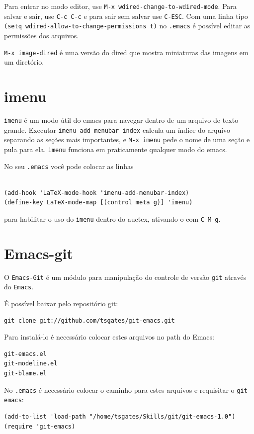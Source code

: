 \documentclass[12pt,brazil]{book}
\begin{document}
Para entrar no modo editor, use \texttt{M-x
  wdired-change-to-wdired-mode}. Para salvar e sair, use \texttt{C-c
  C-c} e para sair sem salvar use \texttt{C-ESC}. Com uma linha tipo
\texttt{(setq wdired-allow-to-change-permissions t)} no
\texttt{.emacs} é possível editar as permissões dos arquivos.

\texttt{M-x image-dired} é uma versão do dired que mostra miniaturas
das imagens em um diretório.


\section{imenu}
\label{sec:imenu}

\texttt{imenu} é um modo útil do emacs para navegar dentro de um
arquivo de texto grande. Executar \texttt{imenu-add-menubar-index}
calcula um índice do arquivo separando as seções mais importantes, e
\texttt{M-x imenu} pede o nome de uma seção e pula para
ela. \texttt{imenu} funciona em praticamente qualquer modo do emacs.

No seu \texttt{.emacs} você pode colocar as linhas
\begin{verbatim}

(add-hook 'LaTeX-mode-hook 'imenu-add-menubar-index)
(define-key LaTeX-mode-map [(control meta g)] 'imenu)

\end{verbatim}
para habilitar o uso do \texttt{imenu} dentro do auctex, ativando-o
com \texttt{C-M-g}.

\section{Emacs-git}
\label{sec:emacs-git}

O \texttt{Emacs-Git} é um módulo para manipulação do controle de
versão \texttt{git} através do \texttt{Emacs}.

É possível baixar pelo repositório git:

\begin{verbatim}
git clone git://github.com/tsgates/git-emacs.git
\end{verbatim}

Para instalá-lo é necessário colocar estes arquivos no path do Emacs:

\begin{verbatim}
git-emacs.el
git-modeline.el
git-blame.el
\end{verbatim}

No \texttt{.emacs} é necessário colocar o caminho para estes arquivos
e requisitar o \texttt{git-emacs}:
\begin{verbatim}
(add-to-list 'load-path "/home/tsgates/Skills/git/git-emacs-1.0")
(require 'git-emacs)
\end{verbatim}
\end{document}
